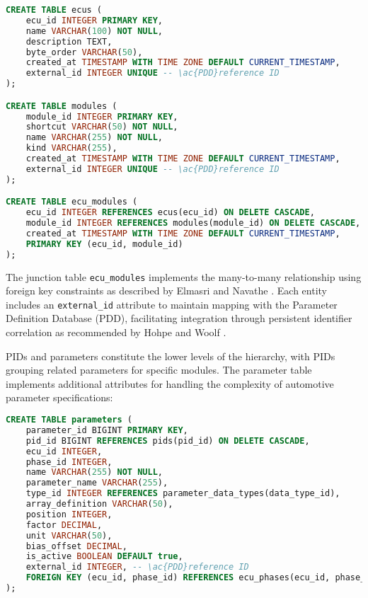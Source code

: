 \begin{lstlisting}[language=SQL, caption={ECU and Module Table Implementation}, label={lst:ecu-module-tables}]
CREATE TABLE ecus (
    ecu_id INTEGER PRIMARY KEY,
    name VARCHAR(100) NOT NULL,
    description TEXT,
    byte_order VARCHAR(50),
    created_at TIMESTAMP WITH TIME ZONE DEFAULT CURRENT_TIMESTAMP,
    external_id INTEGER UNIQUE -- \ac{PDD}reference ID
);

CREATE TABLE modules (
    module_id INTEGER PRIMARY KEY,
    shortcut VARCHAR(50) NOT NULL,
    name VARCHAR(255) NOT NULL,
    kind VARCHAR(255),
    created_at TIMESTAMP WITH TIME ZONE DEFAULT CURRENT_TIMESTAMP,
    external_id INTEGER UNIQUE -- \ac{PDD}reference ID
);

CREATE TABLE ecu_modules (
    ecu_id INTEGER REFERENCES ecus(ecu_id) ON DELETE CASCADE,
    module_id INTEGER REFERENCES modules(module_id) ON DELETE CASCADE,
    created_at TIMESTAMP WITH TIME ZONE DEFAULT CURRENT_TIMESTAMP,
    PRIMARY KEY (ecu_id, module_id)
);
\end{lstlisting}

The junction table \texttt{ecu\_modules} implements the many-to-many relationship using foreign key constraints as described by Elmasri and Navathe \cite{elmasri2015fundamentals}. Each entity includes an \texttt{external\_id} attribute to maintain mapping with the Parameter Definition Database (PDD), facilitating integration through persistent identifier correlation as recommended by Hohpe and Woolf \cite{hohpe2002enterprise}.

\acp{PID} and parameters constitute the lower levels of the hierarchy, with PIDs grouping related parameters for specific modules. The parameter table implements additional attributes for handling the complexity of automotive parameter specifications:

\begin{lstlisting}[language=SQL, caption={Parameter Table Implementation}, label={lst:parameter-table}]
CREATE TABLE parameters (
    parameter_id BIGINT PRIMARY KEY,
    pid_id BIGINT REFERENCES pids(pid_id) ON DELETE CASCADE,
    ecu_id INTEGER,
    phase_id INTEGER,
    name VARCHAR(255) NOT NULL,
    parameter_name VARCHAR(255),
    type_id INTEGER REFERENCES parameter_data_types(data_type_id),
    array_definition VARCHAR(50),
    position INTEGER,
    factor DECIMAL,
    unit VARCHAR(50),
    bias_offset DECIMAL,
    is_active BOOLEAN DEFAULT true,
    external_id INTEGER, -- \ac{PDD}reference ID
    FOREIGN KEY (ecu_id, phase_id) REFERENCES ecu_phases(ecu_id, phase_id)
);
\end{lstlisting}

